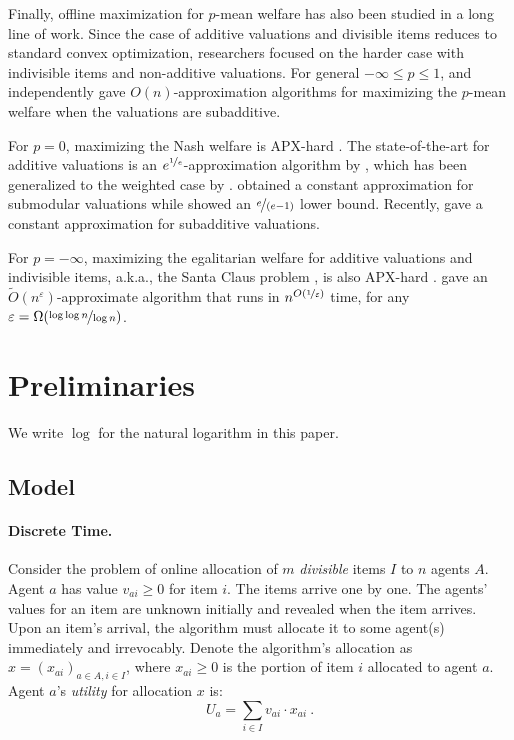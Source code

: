 \documentclass[11pt,letterpaper]{article}
\newcommand{\utility}{U}
\begin{document}
Finally, offline maximization for $p$-mean welfare has also been studied in a long line of work.
Since the case of additive valuations and divisible items reduces to standard convex optimization, researchers focused on the harder case with indivisible items and non-additive valuations.
For general $-\infty \le p \le 1$, \citet{BarmanBKS:ESA:2020} and \citet{ChaudhuryGM:AAAI:2021} independently gave $O(n)$-approximation algorithms for maximizing the $p$-mean welfare when the valuations are subadditive.

For $p = 0$, maximizing the Nash welfare is APX-hard \citep{Lee:IPL:2017}.
The state-of-the-art for additive valuations is an $e^{\nicefrac{1}{e}}$-approximation algorithm by \citet{BarmanKV:EC:2018}, which has been generalized to the weighted case by \citet{FengL:ICALP:2024}.
\citet{LiV:FOCS:2022} obtained a constant approximation for submodular valuations while \citet{GargKK:SODA:2020} showed an $\nicefrac{e}{(e-1)}$ lower bound.
Recently, \citet{DobzinskiLRV:STOC:2024} gave a constant approximation for subadditive valuations.

For $p = -\infty$, maximizing the egalitarian welfare for additive valuations and indivisible items, a.k.a., the Santa Claus problem \citep[e.g.,][]{BansalS:STOC:2006}, is also APX-hard \citep{BezakovaD:SIGecom:2005}.
\citet{ChakrabartyCK:FOCS:2009} gave an $\tilde{O}(n^\varepsilon)$-approximate algorithm that runs in $n^{O(\nicefrac{1}{\varepsilon})}$ time, for any $\varepsilon=\Omega(\nicefrac{\log\log n}{\log n})$.

 \section{Preliminaries}
\label{sec:prelim}

We write $\log$ for the natural logarithm in this paper.


\subsection{Model}

\paragraph{Discrete Time.}
Consider the problem of online allocation of $m$ \emph{divisible} items $I$ to $n$ agents $A$.
Agent $a$ has value $v_{ai} \ge 0$ for item $i$.
The items arrive one by one.
The agents' values for an item are unknown initially and revealed when the item arrives.
Upon an item's arrival, the algorithm must allocate it to some agent(s) immediately and irrevocably.
Denote the algorithm's allocation as $x = ( x_{ai} )_{a \in A, i \in I}$, where $x_{ai} \ge 0$ is the portion of item $i$ allocated to agent $a$.
Agent $a$'s \emph{utility} for allocation $x$ is:
\[
	\utility_a = \sum_{i \in I} v_{ai} \cdot x_{ai} 
	~.
\]
\end{document}
